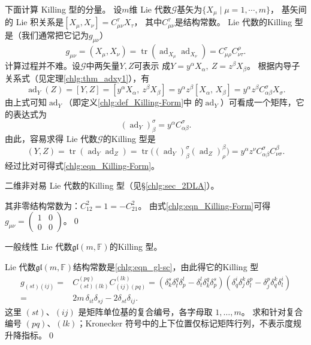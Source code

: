 下面计算 Killing 型的分量。
设$m$维 Lie 代数$\mathscr{G}$基矢为$\{X_\mu \mid \mu=1,\cdots,m\}$，
基矢间的 Lie 积关系是$[X_\mu, X_\nu]=C^\tau_{\mu\nu} X_\tau$，
其中$C^\tau_{\mu\nu}$是结构常数。
 Lie 代数的Killing 型是（我们通常把它记为$g_{\mu\nu}$）
\begin{equation}\label{chlg:eqn_Killing-Form}
    g_{\mu\nu} = (X_\mu, X_\nu )= \operatorname{tr}(\operatorname{ad}_{X_\mu}  \operatorname{ad}_{X_\nu} )
    = C^\tau_{\mu\rho} C^\rho_{\nu\tau} .
\end{equation}
计算过程并不难。设$\mathscr{G}$中两矢量$Y,Z$可表示
成$Y=y^\alpha X_\alpha,\  Z= z^\beta X_\beta$。
根据内导子关系式（见定理\ref{chlg:thm_adxy1}），有
\begin{equation}
    \operatorname{ad}_Y(Z)=[Y,Z]=[y^\alpha X_\alpha,\  z^\beta X_\beta]
    = y^\alpha z^\beta[ X_\alpha,\, X_\beta]
    = y^\alpha z^\beta C^\sigma_{\alpha\beta} X_\sigma .
\end{equation}
由上式可知$\operatorname{ad}_Y$（即定义\ref{chlg:def_Killing-Form}中
的$\operatorname{ad}_Y$）可看成一个矩阵，它的表达式为
\begin{equation}
    (\operatorname{ad}_Y)^\sigma _\beta = y^\alpha C^\sigma_{\alpha\beta} .
\end{equation}
由此，容易求得 Lie 代数$\mathscr{G}$的Killing 型是
\begin{equation}
    (Y,Z)=\operatorname{tr}(\operatorname{ad}_Y  \operatorname{ad}_Z )
    = \operatorname{tr}\bigl((\operatorname{ad}_Y)^\sigma _\beta (\operatorname{ad}_Z)^\beta _\rho \bigr)
    =  y^\alpha z^\nu C^\sigma_{\alpha\beta}  C^\beta_{\nu\sigma} .
\end{equation}
经过比对可得式\eqref{chlg:eqn_Killing-Form}。

\begin{example}
	二维非对易 Lie 代数的Killing 型（见\S\ref{chlg:sec_2DLA}）。
\end{example}

其非零结构常数为：$C^2_{12}=1=-C^2_{21}$。
由式\eqref{chlg:eqn_Killing-Form}可得
$g_{\mu\nu}=\left(\begin{smallmatrix} 1 & 0 \\ 0 & 0\end{smallmatrix}\right)$。\qed

\begin{example}
    一般线性 Lie 代数$\mathfrak{gl}(m,\mathbb{F})$的Killing 型。
\end{example}
 Lie 代数$\mathfrak{gl}(m,\mathbb{F})$结构常数是\eqref{chlg:eqn_gl-sc}，由此得它的Killing 型
\begin{equation}
\begin{aligned}
    g_{(st)(ij)} =& C^{(pq)}_{(st)(lk)} C^{(lk)}_{(ij)(pq)}
    = \left(\delta^s_{k} \delta^q_{t} \delta^l_{p}
    -\delta^l_{t} \delta^q_{k} \delta^s_{p} \right)
    \left(\delta^i_{q} \delta^k_{j} \delta^p_{l}
    -\delta^p_{j} \delta^k_{q} \delta^i_{l} \right) \\
    =& 2m\, \delta_{it} \delta_{sj} - 2\delta_{st} \delta_{ij}.
\end{aligned}
\end{equation}
这里 $(st)$、$(ij)$ 是矩阵单位基的复合编号，各字母取 $1,\ldots,m$。
求和针对复合编号 $(pq)$、$(lk)$；Kronecker 符号中的上下位置仅标记矩阵行列，不表示度规升降指标。\qed

